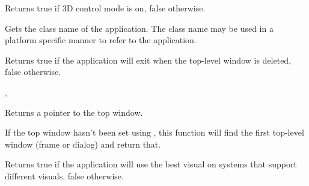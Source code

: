 \label{wxappgetauto3d}


Returns true if 3D control mode is on, false otherwise.




\label{wxappgetclassname}


Gets the class name of the application. The class name may be used in a platform specific
manner to refer to the application.




\label{wxappgetexitonframedelete}


Returns true if the application will exit when the top-level window is deleted, false
otherwise.


,\\


\label{wxappgettopwindow}


Returns a pointer to the top window.


If the top window hasn't been set using , this
function will find the first top-level window (frame or dialog) and return that.




\label{wxappgetusebestvisual}


Returns true if the application will use the best visual on systems that support
different visuals, false otherwise.


